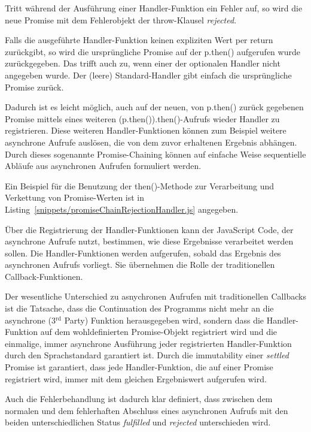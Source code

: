 \documentclass[
11pt, %
a4paper, %
oneside, %
pdfspacing, %
headinclude,
BCOR5mm, %
ngerman, %
bibtotocnumbered,
]{scrartcl}
\begin{document}
			Tritt während der Ausführung einer Handler-Funktion ein Fehler auf, so wird die neue Promise mit dem Fehlerobjekt der \textsf{throw}-Klausel \emph{rejected}. 
			
			Falls die ausgeführte Handler-Funktion keinen expliziten Wert per \textsf{return} zurückgibt, so wird die ursprüngliche Promise auf der \textsf{p.then()} aufgerufen wurde zurückgegeben. Das trifft auch zu, wenn einer der optionalen Handler nicht angegeben wurde. Der (leere) Standard-Handler gibt einfach die ursprüngliche Promise zurück.

			Dadurch ist es leicht möglich, auch auf der neuen, von \textsf{p.then()} zurück gegebenen Promise mittels eines weiteren \textsf{(p.then()).then()}-Aufrufs wieder Handler zu registrieren. Diese weiteren Handler-Funktionen können zum Beispiel weitere asynchrone Aufrufe auslösen, die von dem zuvor erhaltenen Ergebnis abhängen.			
			Durch dieses sogenannte Promise-Chaining können auf einfache Weise sequentielle Abläufe aus asynchronen Aufrufen formuliert werden.
			
			Ein Beispiel für die Benutzung der \textsf{then()}-Methode zur Verarbeitung und Verkettung von Promise-Werten ist in Listing~\ref{snippets/promiseChainRejectionHandler.js} angegeben.
			
			
			Über die Registrierung der Handler-Funktionen kann der JavaScript \-Code, der asynchrone Aufrufe nutzt, bestimmen, wie diese Ergebnisse verarbeitet werden sollen. Die Handler-Funktionen werden aufgerufen, sobald das Ergebnis des asynchronen Aufrufs vorliegt. Sie übernehmen die Rolle der traditionellen Callback-Funktionen. 
			
			Der wesentliche Unterschied zu asnychronen Aufrufen mit traditionellen Callbacks ist die Tatsache, dass die Continuation des Programms nicht mehr an die asynchrone (3$^\mathrm{rd}$ Party) Funktion herausgegeben wird, sondern dass die Handler-Funktion auf dem wohldefinierten Promise-Objekt registriert wird und die einmalige, immer asynchrone Ausführung jeder registrierten Handler-Funktion durch den Sprachstandard garantiert ist. Durch die immutability einer \emph{settled} Promise ist garantiert, dass jede Handler-Funktion, die auf einer Promise registriert wird, immer mit dem gleichen Ergebniswert aufgerufen wird. 
			
			Auch die Fehlerbehandlung ist dadurch klar definiert, dass zwischen dem normalen und dem fehlerhaften Abschluss eines asynchronen Aufrufs mit den beiden unterschiedlichen Status \emph{fulfilled} und \emph{rejected} unterschieden wird. 
	
\end{document}
